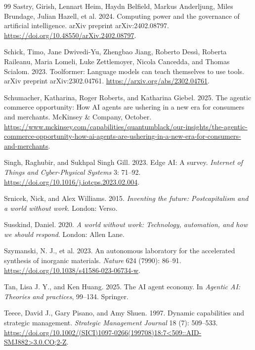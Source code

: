 \documentclass[11pt]{article}
\begin{document}
\begin{thebibliography}{99}
Sastry, Girish, Lennart Heim, Haydn Belfield, Markus Anderljung, Miles Brundage, Julian Hazell, et al. 2024. Computing power and the governance of artificial intelligence. arXiv preprint arXiv:2402.08797. \url{https://doi.org/10.48550/arXiv.2402.08797}.

Schick, Timo, Jane Dwivedi-Yu, Zhengbao Jiang, Roberto Dess\`i, Roberta Raileanu, Maria Lomeli, Luke Zettlemoyer, Nicola Cancedda, and Thomas Scialom. 2023. Toolformer: Language models can teach themselves to use tools. arXiv preprint arXiv:2302.04761. \url{https://arxiv.org/abs/2302.04761}.

Schumacher, Katharina, Roger Roberts, and Katharina Giebel. 2025. The agentic commerce opportunity: How AI agents are ushering in a new era for consumers and merchants. McKinsey \& Company, October. \url{https://www.mckinsey.com/capabilities/quantumblack/our-insights/the-agentic-commerce-opportunity-how-ai-agents-are-ushering-in-a-new-era-for-consumers-and-merchants}.

Singh, Raghubir, and Sukhpal Singh Gill. 2023. Edge AI: A survey. \textit{Internet of Things and Cyber-Physical Systems} 3: 71--92. \url{https://doi.org/10.1016/j.iotcps.2023.02.004}.

Srnicek, Nick, and Alex Williams. 2015. \textit{Inventing the future: Postcapitalism and a world without work}. London: Verso.

Susskind, Daniel. 2020. \textit{A world without work: Technology, automation, and how we should respond}. London: Allen Lane.

Szymanski, N. J., et al. 2023. An autonomous laboratory for the accelerated synthesis of inorganic materials. \textit{Nature} 624 (7990): 86--91. \url{https://doi.org/10.1038/s41586-023-06734-w}.

Tan, Lisa J. Y., and Ken Huang. 2025. The AI agent economy. In \textit{Agentic AI: Theories and practices}, 99--134. Springer.

Teece, David J., Gary Pisano, and Amy Shuen. 1997. Dynamic capabilities and strategic management. \textit{Strategic Management Journal} 18 (7): 509--533. \url{https://doi.org/10.1002/(SICI)1097-0266(199708)18:7<509::AID-SMJ882>3.0.CO;2-Z}.


\end{thebibliography}
\end{document}
